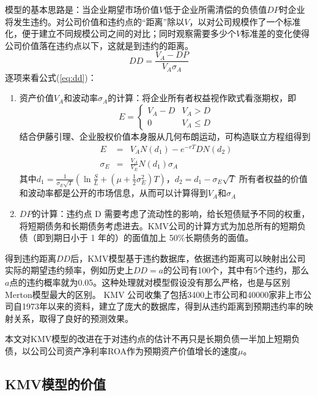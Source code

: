 \documentclass[a4paper,12pt]{ctexart}
\begin{document}
模型的基本思路是：当企业期望市场价值$V$低于企业所需清偿的负债值$DP$时企业将发生违约。对公司价值和违约点的“距离”除以$V$，以对公司规模作了一个标准化，便于建立不同规模公司之间的对比；同时观察需要多少个$V$标准差的变化使得公司价值落在违约点以下，这就是到违约的距离。
\begin{equation}
    DD=\frac{V_A-DP}{V_A\sigma_A}\label{eq:dd}
\end{equation}
逐项来看公式(\ref{eq:dd})：
\begin{enumerate}
    \item 资产价值$V_A$和波动率$\sigma_A$的计算：将企业所有者权益视作欧式看涨期权，即\begin{equation*}
              E=\begin{cases}
                  V_A-D & V_A>D    \\
                  0     & V_A\le D
              \end{cases}
          \end{equation*}
          结合伊藤引理、企业股权价值本身服从几何布朗运动，可构造联立方程组得到\begin{eqnarray}
              E&=&V_AN(d_1)-e^{-rT}DN(d_2)\label{eq:ee}\\
              \sigma_E&=&\frac{V_A}{V_E} N(d_1)\sigma_A
          \end{eqnarray}其中$d_1=\frac{1}{\sigma_E\sqrt{T}}(\ln \frac{S}{L}+(\mu+\frac{1}{2}\sigma^2_E)T)$，$d_2=d_1-\sigma_E\sqrt{T}$
          所有者权益的价值和波动率都是公开的市场信息，从而可以计算得到$V_A$和$\sigma_A$
    \item $DP$的计算：违约点 D 需要考虑了流动性的影响，给长短债赋予不同的权重，将短期债务和长期债务考虑进去。KMV公司的计算方式为加总所有的短期负债（即到期日小于 1 年的）的面值加上 50\%长期债务的面值。
\end{enumerate}

得到违约距离$DD$后，KMV模型基于违约数据库，依据违约距离可以映射出公司实际的期望违约频率，例如历史上$DD=a$的公司有100个，其中有5个违约，那么$a$点的违约概率就为0.05。这种处理就对模型假设没有那么严格，也是与区别Merton模型最大的区别。 KMV 公司收集了包括3400上市公司和40000家非上市公司自1973年以来的资料，建立了庞大的数据库，得到从违约距离到预期违约率的映射关系，取得了良好的预测效果。

本文对KMV模型的改进在于对违约点的估计不再只是长期负债一半加上短期负债，以公司公司资产净利率ROA作为预期资产价值增长的速度$\mu$。

\subsection{KMV模型的价值}
\end{document}
